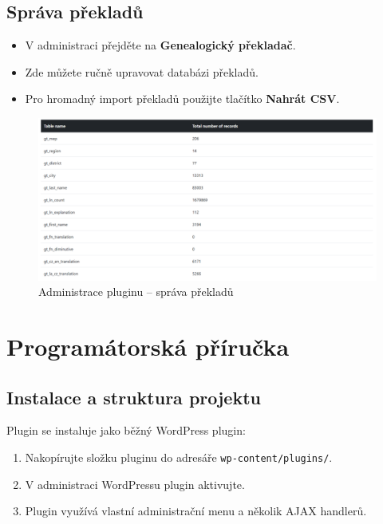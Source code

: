 \documentclass[czech, ba, kiv, he]{fasthesis}
\begin{document}
\subsection{Správa překladů}

\begin{itemize}
    \item V administraci přejděte na \textbf{Genealogický překladač}.
    \item Zde můžete ručně upravovat databázi překladů.
    \item Pro hromadný import překladů použijte tlačítko \textbf{Nahrát CSV}.
\end{itemize}

\begin{figure}[H]
    \centering
    \includegraphics[width=1\textwidth]{database_status.png}
    \caption{Administrace pluginu – správa překladů}
\end{figure}
\newpage
\section{Programátorská příručka}

\subsection{Instalace a struktura projektu}

Plugin se instaluje jako běžný WordPress plugin:

\begin{enumerate}
    \item Nakopírujte složku pluginu do adresáře \texttt{wp-content/plugins/}.
    \item V administraci WordPressu plugin aktivujte.
    \item Plugin využívá vlastní administrační menu a několik AJAX handlerů.
\end{enumerate}
\end{document}
